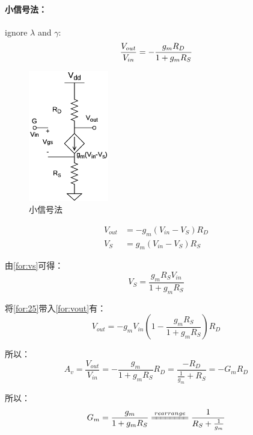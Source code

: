 \documentclass[twoside,a4paper,openright,titlepage,draft]{ctexrep}
\begin{document}
\paragraph{小信号法：}
ignore $\lambda$ and $\gamma$: 
\begin{equation}
    \frac{V_{out}}{V_{in}}=-\frac{g_mR_D}{1+g_mR_S} \notag
\end{equation}
\newpage
\begin{multicols}{2}
    \begin{figure}[H]
        \centering
        \includegraphics[width=35mm]{sourcedegenerationsmallsignal.eps}
        \caption{小信号法}
        \label{fig:小信号法}
    \end{figure}
    \columnbreak
    \begin{align}
        V_{out} &= -g_m(V_{in} - V_S)R_D \label{for:vout} \\
        V_S &= g_m(V_{in} - V_S)R_S \label{for:vs}
    \end{align}
\end{multicols}

由\ref{for:vs}可得：
\begin{equation}
    V_S = \frac{g_mR_SV_{in}}{1 + g_mR_S} \label{for:25}
\end{equation}

将\ref{for:25}带入\ref{for:vout}有：
\begin{equation}
    V_{out} = -g_mV_{in}(1 - \frac{g_mR_S}{1 + g_mR_S})R_D
\end{equation}

所以：
\begin{equation}
    A_v = \frac{V_{out}}{V_{in}} = -\frac{g_m}{1 + g_mR_S}R_D = \frac{-R_D}{\frac{1}{g_m} + R_S} = -G_mR_D
\end{equation}

所以：
\begin{equation}
    G_m = \frac{g_m}{1+g_mR_S} \xlongequal{rearrange} \frac{1}{R_S + {1 \over g_m}}
\end{equation}
\end{document}
